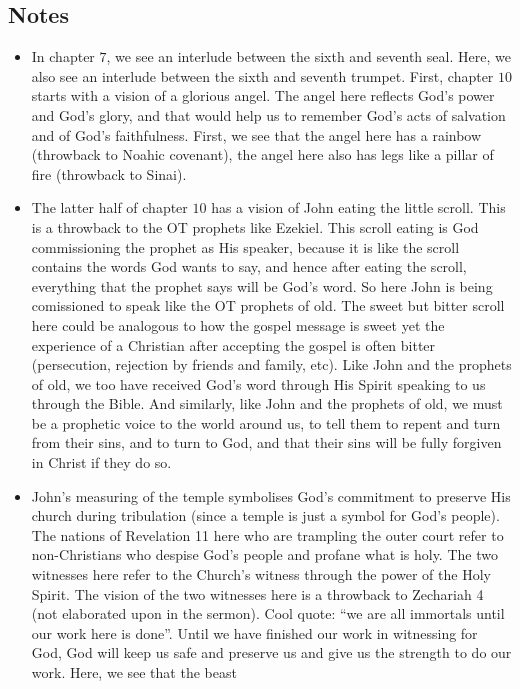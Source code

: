 \subsection*{Notes}
\begin{itemize}
  \item{In chapter $7$, we see an interlude between the sixth and seventh seal.
  Here, we also see an interlude between the sixth and seventh trumpet.
  First, chapter $10$ starts with a vision of a glorious angel.  The angel
  here reflects God's power and God's glory, and that would help us to
  remember God's acts of salvation and of God's faithfulness.  First, we see
  that the angel here has a rainbow (throwback to Noahic covenant), the angel
  here also has legs like a pillar of fire (throwback to Sinai).}
  \item{The latter half of chapter $10$ has a vision of John eating the
  little scroll.  This is a throwback to the OT prophets like Ezekiel.  This
  scroll eating is God commissioning the prophet as His speaker, because it
  is like the scroll contains the words God wants to say, and hence after
  eating the scroll, everything that the prophet says will be God's word.  So
  here John is being comissioned to speak like the OT prophets of old.  The
  sweet but bitter scroll here could be analogous to how the gospel message
  is sweet yet the experience of a Christian after accepting the gospel is
  often bitter (persecution, rejection by friends and family, etc).  Like
  John and the prophets of old, we too have received God's word through His
  Spirit speaking to us through the Bible.  And similarly, like John and the
  prophets of old, we must be a prophetic voice to the world around us, to
  tell them to repent and turn from their sins, and to turn to God, and that
  their sins will be fully forgiven in Christ if they do so.}
  \item{John's measuring of the temple symbolises God's commitment to
  preserve His church during tribulation (since a temple is just a symbol for
  God's people).  The nations of Revelation 11 here who are trampling the
  outer court refer to non-Christians who despise God's people and profane
  what is holy.  The two witnesses here refer to the Church's witness through
  the power of the Holy Spirit.  The vision of the two witnesses here is a
  throwback to Zechariah 4 (not elaborated upon in the sermon).  Cool quote:
  ``we are all immortals until our work here is done''.  Until we have
  finished our work in witnessing for God, God will keep us safe and preserve
  us and give us the strength to do our work.  Here, we see that the beast
}
\end{itemize}
